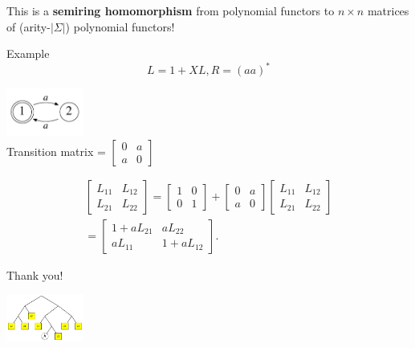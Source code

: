 \documentclass[xcolor=svgnames,12pt]{beamer}
\newenvironment{xframe}[1][]
  {\begin{frame}[fragile,environment=xframe,#1]}
  {\end{frame}}
\renewcommand{\emph}{\textbf}
\begin{document}
\begin{xframe}
  \begin{center}
    This is a \emph{semiring homomorphism} from polynomial functors to
    $n \times n$ matrices of (arity-$|\Sigma|$) polynomial functors!
  \end{center}
\end{xframe}

\begin{xframe}{Example}
\[ L = 1 + XL, R = (aa)^* \]
\begin{center}
\includegraphics[width=1in]{even-DFA} \\
Transition matrix = $\begin{bmatrix}
  0 & a \\ a & 0
\end{bmatrix}$

\begin{multline*}
  \begin{bmatrix}
    L_{11} & L_{12} \\
    L_{21} & L_{22}
  \end{bmatrix}
  =
  \begin{bmatrix}
    1 & 0 \\
    0 & 1
  \end{bmatrix}
  +
  \begin{bmatrix}
    0 & a \\
    a & 0
  \end{bmatrix}
  \begin{bmatrix}
    L_{11} & L_{12} \\
    L_{21} & L_{22}
  \end{bmatrix}
  \\
  =
  \begin{bmatrix}
    1 + a L_{21} & a L_{22} \\
    a L_{11} & 1+ a L_{12}
  \end{bmatrix}.
\end{multline*}
\end{center}
\end{xframe}

\begin{xframe}
  \begin{center}
    Thank you! \bigskip

    \includegraphics[width=1in]{deriv-tree}

  \end{center}
\end{xframe}


\end{document}
